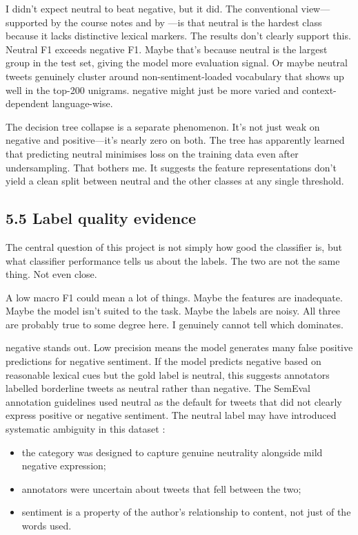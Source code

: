 \documentclass[12pt]{article}
\begin{document}
I didn't expect neutral to beat negative, but it did. The conventional view---supported by the course notes and by \citet{kenyondean2018sentiment}---is that neutral is the hardest class because it lacks distinctive lexical markers. The results don't clearly support this. Neutral F1 exceeds negative F1. Maybe that's because neutral is the largest group in the test set, giving the model more evaluation signal. Or maybe neutral tweets genuinely cluster around non-sentiment-loaded vocabulary that shows up well in the top-200 unigrams. negative might just be more varied and context-dependent language-wise.

The decision tree collapse is a separate phenomenon. It's not just weak on negative and positive---it's nearly zero on both. The tree has apparently learned that predicting neutral minimises loss on the training data even after undersampling. That bothers me. It suggests the feature representations don't yield a clean split between neutral and the other classes at any single threshold.



\subsection*{5.5 Label quality evidence}



The central question of this project is not simply how good the classifier is, but what classifier performance tells us about the labels. The two are not the same thing. Not even close.

A low macro F1 could mean a lot of things. Maybe the features are inadequate. Maybe the model isn't suited to the task. Maybe the labels are noisy. All three are probably true to some degree here. I genuinely cannot tell which dominates.

negative stands out. Low precision means the model generates many false positive predictions for negative sentiment. If the model predicts negative based on reasonable lexical cues but the gold label is neutral, this suggests annotators labelled borderline tweets as neutral rather than negative. The SemEval annotation guidelines used neutral as the default for tweets that did not clearly express positive or negative sentiment. The neutral label may have introduced systematic ambiguity in this dataset \citep{kenyondean2018sentiment}:

\begin{itemize}

  \item the category was designed to capture genuine neutrality alongside mild negative expression;

  \item annotators were uncertain about tweets that fell between the two;

  \item sentiment is a property of the author's relationship to content, not just of the words used.

\end{itemize}
\end{document}
